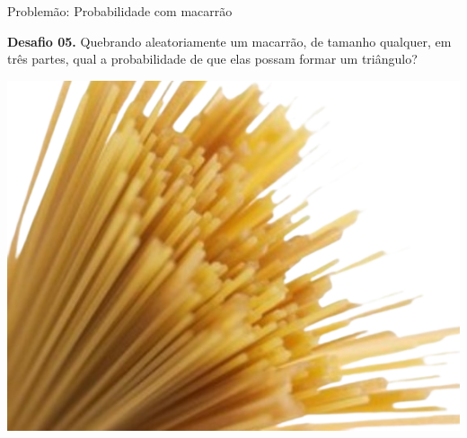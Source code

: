 \documentclass[12pt]{beamer}
\begin{document}
\begin{frame}{Problemão: Probabilidade com macarrão}

    \begin{exampleblock}{\textbf{Desafio 05.}}
        \justifying
        Quebrando aleatoriamente um macarrão, de tamanho qualquer, em três partes, qual a probabilidade de que elas possam formar um triângulo?

        \begin{center}
            \includegraphics[scale=0.3]{imagens/macarrao_rmvbg.png}
        \end{center}
    
    \end{exampleblock}
   
\end{frame}
\end{document}
